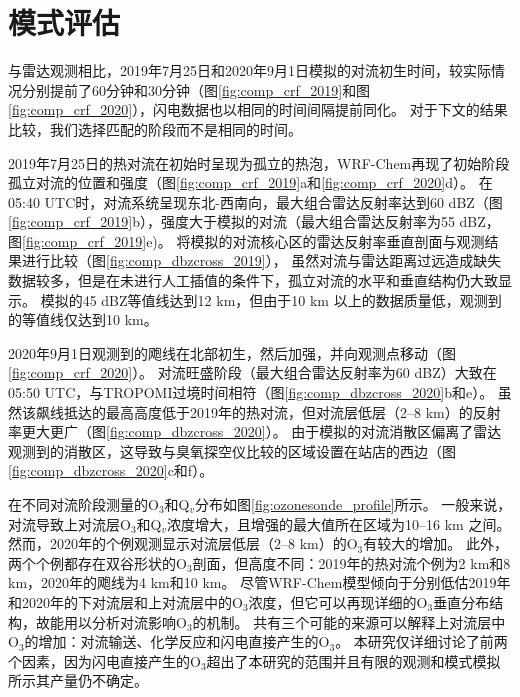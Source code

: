 \section{模式评估}

与雷达观测相比，2019年7月25日和2020年9月1日模拟的对流初生时间，较实际情况分别提前了60分钟和30分钟（图\ref{fig:comp_crf_2019}和图\ref{fig:comp_crf_2020}），闪电数据也以相同的时间间隔提前同化。
对于下文的结果比较，我们选择匹配的阶段而不是相同的时间。

2019年7月25日的热对流在初始时呈现为孤立的热泡，WRF-Chem再现了初始阶段孤立对流的位置和强度（图\ref{fig:comp_crf_2019}a和\ref{fig:comp_crf_2020}d）。
在05:40 UTC时，对流系统呈现东北-西南向，最大组合雷达反射率达到60 dBZ（图\ref{fig:comp_crf_2019}b），强度大于模拟的对流（最大组合雷达反射率为55 dBZ，图\ref{fig:comp_crf_2019}e)。
将模拟的对流核心区的雷达反射率垂直剖面与观测结果进行比较（图\ref{fig:comp_dbzcross_2019}），
虽然对流与雷达距离过远造成缺失数据较多，但是在未进行人工插值的条件下，孤立对流的水平和垂直结构仍大致显示。
模拟的45 dBZ等值线达到12 km，但由于10 km 以上的数据质量低，观测到的等值线仅达到10 km。

2020年9月1日观测到的飑线在北部初生，然后加强，并向观测点移动（图\ref{fig:comp_crf_2020}）。
对流旺盛阶段（最大组合雷达反射率为60 dBZ）大致在05:50 UTC，与TROPOMI过境时间相符（图\ref{fig:comp_dbzcross_2020}b和e）。
虽然该飙线抵达的最高高度低于2019年的热对流，但对流层低层（2--8 km）的反射率更大更广（图\ref{fig:comp_dbzcross_2020}）。
由于模拟的对流消散区偏离了雷达观测到的消散区，这导致与臭氧探空仪比较的区域设置在站店的西边（图\ref{fig:comp_dbzcross_2020}c和f）。

在不同对流阶段测量的O$_3$和Q$_v$分布如图\ref{fig:ozonesonde_profile}所示。
一般来说，对流导致上对流层O$_3$和Q$_v$浓度增大，且增强的最大值所在区域为10--16 km 之间。
然而，2020年的个例观测显示对流层低层（2--8 km）的O$_3$有较大的增加。
此外，两个个例都存在双谷形状的O$_3$剖面，但高度不同：2019年的热对流个例为2 km和8 km，2020年的飑线为4 km和10 km。
尽管WRF-Chem模型倾向于分别低估2019年和2020年的下对流层和上对流层中的O$_3$浓度，但它可以再现详细的O$_3$垂直分布结构，故能用以分析对流影响O$_3$的机制。
共有三个可能的来源可以解释上对流层中O$_3$的增加：对流输送、化学反应和闪电直接产生的O$_3$。
本研究仅详细讨论了前两个因素，因为闪电直接产生的O$_3$超出了本研究的范围并且有限的观测和模式模拟所示其产量仍不确定\citep{Morris.2010,Ripoll.2014}。


